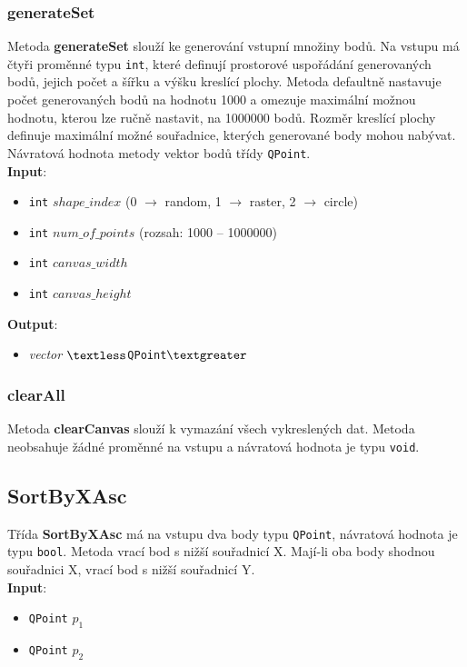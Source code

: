 \documentclass[a4paper, 12pt]{article}
\begin{document}
\subsubsection{generateSet}
Metoda \textbf{generateSet} slouží ke generování vstupní množiny bodů. Na vstupu má čtyři proměnné typu \texttt{int}, které definují prostorové uspořádání generovaných bodů, jejich počet a šířku a výšku kreslící plochy. Metoda defaultně nastavuje počet generovaných bodů na hodnotu 1000 a omezuje maximální možnou hodnotu, kterou lze ručně nastavit, na 1000000 bodů. Rozměr kreslící plochy definuje maximální možné souřadnice, kterých generované body mohou nabývat. Návratová hodnota metody vektor bodů třídy \texttt{QPoint}.\\

\textbf{Input}:
\begin{itemize}
\item \texttt{int} $shape\_index$ (0 $\rightarrow$ random, 1 $\rightarrow$ raster, 2 $\rightarrow$ circle)
\item \texttt{int} $num\_of\_points$ (rozsah: 1000 – 1000000)
\item \texttt{int} $canvas\_width$
\item \texttt{int} $canvas\_height$
\end{itemize}

\textbf{Output}:
\begin{itemize}
\item \textsl{vector} $\textless$\texttt{QPoint}$\textgreater$
\end{itemize}

\subsubsection{clearAll}
Metoda \textbf{clearCanvas} slouží k vymazání všech vykreslených dat. Metoda neobsahuje žádné proměnné na vstupu a návratová hodnota je typu \texttt{void}.

\subsection{SortByXAsc}
Třída \textbf{SortByXAsc} má na vstupu dva body typu \texttt{QPoint}, návratová hodnota je typu \texttt{bool}. Metoda vrací bod s nižší  souřadnicí X. Mají-li oba body shodnou souřadnici X, vrací bod s nižší souřadnicí Y.\\

\textbf{Input}:
\begin{itemize}
\item \texttt{QPoint} $p_1$
\item \texttt{QPoint} $p_2$
\end{itemize}
\end{document}
